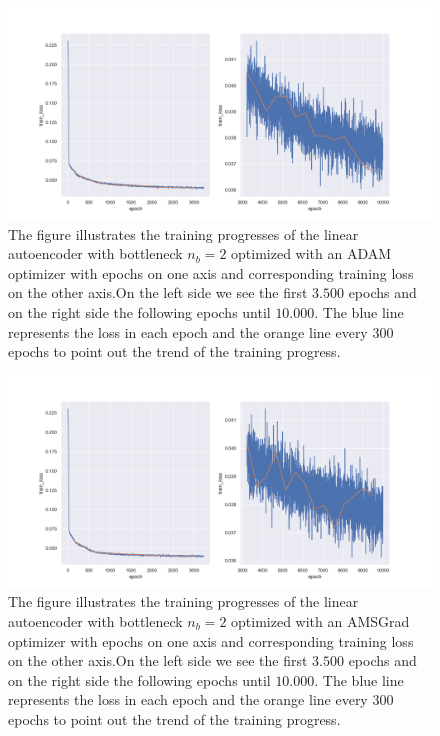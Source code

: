 \begin{figure}
\begin{center}
\includegraphics[width=\linewidth]{linear_AE_2d_adam_training_progress}
\end{center}
\caption{The figure illustrates the training progresses of the linear autoencoder with bottleneck $n_b=2$ optimized with an ADAM optimizer with epochs on one axis and corresponding training loss on the other axis.On the left side we see the first $3.500$ epochs and on the right side the following epochs until $10.000$. The blue line represents the loss in each epoch and the orange line every $300$ epochs to point out the trend of the training progress.}\label{fig:linear_AE_2d_adam_training_progress}
\end{figure}


\begin{figure}
\begin{center}
\includegraphics[width=\linewidth]{linear_AE_2d_amsgrad_training_progress}
\end{center}
\caption{The figure illustrates the training progresses of the linear autoencoder with bottleneck $n_b=2$ optimized with an AMSGrad optimizer with epochs on one axis and corresponding training loss on the other axis.On the left side we see the first $3.500$ epochs and on the right side the following epochs until $10.000$. The blue line represents the loss in each epoch and the orange line every $300$ epochs to point out the trend of the training progress.}\label{fig:linear_AE_2d_amsgrad_training_progress}
\end{figure}



